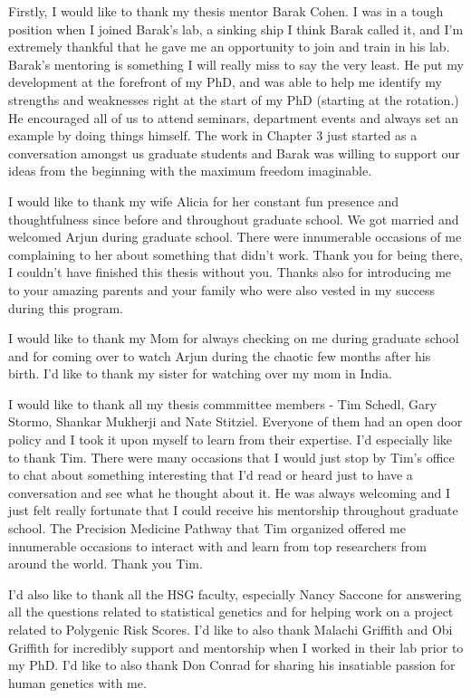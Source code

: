 \thesisacknowledgments

Firstly, I would like to thank my thesis mentor Barak Cohen. I was in a tough position when I joined Barak's lab, a sinking ship I think Barak called it, and I'm extremely thankful that he gave me an opportunity to join and train in his lab. Barak's mentoring is something I will really miss to say the very least. He put my development at the forefront of my PhD, and was able to help me identify my strengths and weaknesses right at the start of my PhD (starting at the rotation.) He encouraged all of us to attend seminars, department events and always set an example by doing things himself. The work in Chapter 3 just started as a conversation amongst us graduate students and Barak was willing to support our ideas from the beginning with the maximum freedom imaginable. 

I would like to thank my wife Alicia for her constant fun presence and thoughtfulness since before and throughout graduate school. We got married and welcomed Arjun during graduate school. There were innumerable occasions of me complaining to her about something that didn't work. Thank you for being there, I couldn't have finished this thesis without you. Thanks also for introducing me to your amazing parents and your family who were also vested in my success during this program.

I would like to thank my Mom for always checking on me during graduate school and for coming over to watch Arjun during the chaotic few months after his birth. I'd like to thank my sister for watching over my mom in India.

I would like to thank all my thesis commmittee members - Tim Schedl, Gary Stormo, Shankar Mukherji and Nate Stitziel. Everyone of them had an open door policy and I took it upon myself to learn from their expertise. I'd especially like to thank Tim. There were many occasions that I would just stop by Tim's office to chat about something interesting that I'd read or heard just to have a conversation and see what he thought about it. He was always welcoming and I just felt really fortunate that I could receive his mentorship throughout graduate school. The Precision Medicine Pathway that Tim organized offered me innumerable occasions to interact with and learn from top researchers from around the world. Thank you Tim.

I'd also like to thank all the HSG faculty, especially Nancy Saccone for answering all the questions related to statistical genetics and for helping work on a project related to Polygenic Risk Scores. I'd like to also thank Malachi Griffith and Obi Griffith for incredibly support and mentorship when I worked in their lab prior to my PhD. I'd like to also thank Don Conrad for sharing his insatiable passion for human genetics with me.

